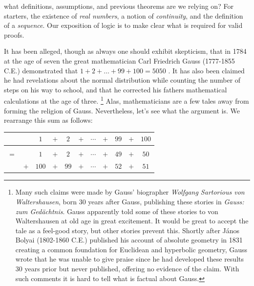     what definitions, assumptions, and previous theorems are we relying on? For
    starters, the existence of \textit{real numbers}, a notion of
    \textit{continuity}, and the definition of a \textit{sequence}. Our
    exposition of logic is to make clear what is required for valid proofs.
    \begin{example}
        \label{ex:Logic_Gauss_Sum}%
        It has been alleged, though as always one should exhibit skepticism,
        that in 1784 at the age of seven the great mathematician Carl
        Friedrich Gauss (1777-1855 C.E.)
        demonstrated that $1+2+\dots+99+100=5050$ \cite[p.~12-13]{von1856gauss}.
        It has also been claimed he had revelations about the normal
        distribution while counting the number of steps on his way to school,
        and that he corrected his fathers mathematical calculations at the age
        of three.%
        \footnote{%
            Many such claims were made by Gauss' biographer
            \textit{Wolfgang Sartorious von Waltershausen}, born 30 years after
            Gauss, publishing these stories in
            \textit{Gauss: zum Ged\"{a}chtnis}. Gauss apparently told some of
            these stories to von Waltershausen at old age in great excitement.
            It would be great to accept the tale as a feel-good story, but
            other stories prevent this. Shortly after J\'{a}nos Bolyai
            (1802-1860 C.E.) published his account of
            absolute geometry in 1831 creating a common foundation for Euclidean
            and hyperbolic geometry, Gauss wrote that he was unable to give
            praise since he had developed these results 30 years prior but
            never published, offering no evidence of the claim. With such
            comments it is hard to tell what is factual about Gauss.
        }
        Alas, mathematicians are a few tales away from forming the religion of
        Gauss. Nevertheless, let's see what the argument is. We rearrange this
        sum as follows:
        \begin{table}[H]
            \centering
            \captionsetup{type=table}
            \begin{tabular}{ccccccccccc}
                &&$1$&$+$&$2$&$+$&$\cdots$&$+$&$99$&$+$&$100$\\
                \hline\\
                $=$&&$1$&$+$&$2$&$+$&$\cdots$&$+$&$49$&$+$&$50$\\
                &$+$&$100$&$+$&$99$&$+$&$\cdots$&$+$&$52$&$+$&$51$\\

\end{tabular}
\end{table}
\end{example}
